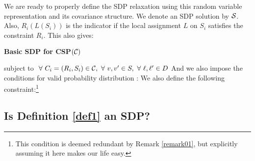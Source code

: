 We are ready to properly define the SDP relaxation using this random variable representation and its covariance structure.  
We denote an SDP solution by $\mathcal{S}$. Also, $R_i(L(S_i))$ is the indicator if the local assignment $L$ on $S_i$ satisfies the constraint $R_i$. This also gives: 
\begin{definition}{\label{def1}}
{\bf Basic SDP for CSP$(\mathcal{C})$}  

subject to $\ \forall \  C_i = (R_i, S_i) \in \mathcal{C},\ \forall \  v, v' \in S, \ \forall \  \ell, \ell' \in D $
And we also impose the conditions for valid probability distribution : 
We also define the following constraint:\footnote{This condition is deemed redundant by Remark \ref{remark01}, but explicitly assuming it here makes our life easy.} 
\end{definition}

\subsection{Is Definition \ref{def1} an SDP?}


